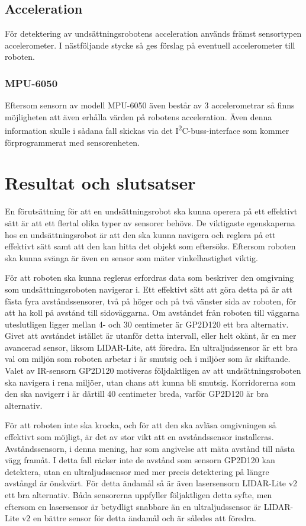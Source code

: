 \documentclass[11pt]{article}
\begin{document}
\begin{flushleft}
\subsection{Acceleration}
För detektering av undsättningsrobotens acceleration används främst sensortypen accelerometer. I nästföljande stycke så ges förslag på eventuell accelerometer till roboten.

\subsubsection{MPU-6050}
Eftersom sensorn av modell MPU-6050 även består av 3 accelerometrar så finns möjligheten att även erhålla värden på robotens acceleration. Även denna information skulle i sådana fall skickas via det I\textsuperscript{2}C-buss-interface som kommer förprogrammerat med sensorenheten. \cite{MPU}


\pagebreak
\section{Resultat och slutsatser}
En förutsättning för att en undsättningsrobot ska kunna operera på ett effektivt sätt är att ett flertal olika typer av sensorer behövs. De viktigaste egenskaperna hos en undsättningsrobot är att den ska kunna navigera och reglera på ett effektivt sätt samt att den kan hitta det objekt som eftersöks. Eftersom roboten ska kunna svänga är även en sensor som mäter vinkelhastighet viktig.

För att roboten ska kunna regleras erfordras data som beskriver den omgivning som undsättningsroboten navigerar i. Ett effektivt sätt att göra detta på är att fästa fyra avståndssensorer, två på höger och på två vänster sida av roboten, för att ha koll på avstånd till sidoväggarna. Om avståndet från roboten till väggarna uteslutligen ligger mellan 4- och 30 centimeter är GP2D120 ett bra alternativ. Givet att avståndet istället är utanför detta intervall, eller helt okänt, är en mer avancerad sensor, liksom LIDAR-Lite, att föredra. En ultraljudssensor är ett bra val om miljön som roboten arbetar i är smutsig och i miljöer som är skiftande. Valet av IR-sensorn GP2D120 motiveras följdaktligen av att undsättningsroboten ska navigera i rena miljöer, utan chans att kunna bli smutsig. Korridorerna som den ska navigerr i är därtill 40 centimeter breda, varför GP2D120 är bra alternativ. 

För att roboten inte ska krocka, och för att den ska avläsa omgivningen så effektivt som möjligt, är det av stor vikt att en avståndssensor installeras. Avståndssensorn, i denna mening, har som angivelse att mäta avstånd till nästa vägg framåt. I detta fall räcker inte de avstånd som sensorn GP2D120 kan detektera, utan en ultraljudssensor med mer precis detektering på längre avstångd är önskvärt. För detta ändamål så är även lasersensorn LIDAR-Lite v2 ett bra alternativ. Båda sensorerna uppfyller följaktligen detta syfte, men eftersom en lasersensor är betydligt snabbare än en ultraljudssensor är LIDAR-Lite v2 en bättre sensor för detta ändamål och är således att föredra. 


\end{flushleft}
\end{document}

